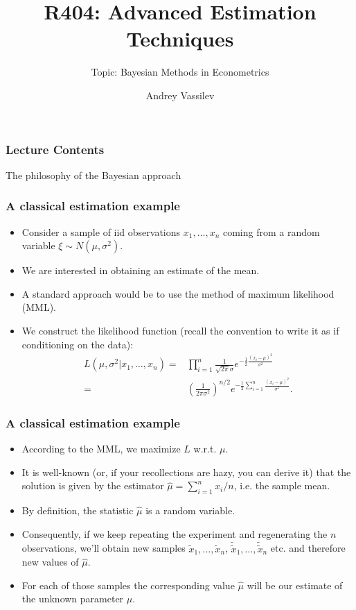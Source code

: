 \documentclass[10pt]{beamer}
\title{R404: Advanced Estimation Techniques}
\subtitle{Topic: Bayesian Methods in Econometrics}
\author{Andrey Vassilev}
\date{}
\theoremstyle{definition}
\begin{document}
\maketitle



\begin{frame}[fragile]
\frametitle{Lecture Contents}
\tableofcontents
\end{frame}

\begin{section}{The philosophy of the Bayesian approach}\label{sec:BayesPhil}

\begin{frame}
\frametitle{A classical estimation example}
\begin{itemize}\itemsep1em
\item Consider a sample of iid observations $x_1,\ldots,x_n$ coming from a random variable $\xi \sim N(\mu,\sigma^2)$.
\item We are interested in obtaining an estimate of the mean.
\item A standard approach would be to use the method of maximum likelihood (MML).
\item We construct the likelihood function (recall the convention to write it as if conditioning on the data):
\begin{equation}
\label{eq:NormLik}
\begin{split}
L(\mu,\sigma^2|x_1,\ldots,x_n)= & \prod_{i=1}^{n}\frac{1}{\sqrt{2\pi}\sigma}e^{-\frac{1}{2}\frac{(x_i-\mu)^2}{\sigma^2}}\\
= & \left(
\frac{1}{2\pi\sigma^2}
\right)^{n/2}e^{-\frac{1}{2}\sum_{i=1}^{n}\frac{(x_i-\mu)^2}{\sigma^2}}.
\end{split}
\end{equation}
\end{itemize}
\end{frame}

\begin{frame}
\frametitle{A classical estimation example}
\begin{itemize}\itemsep1em
\item According to the MML, we maximize $ L $ w.r.t. $ \mu $.
\item It is well-known (or, if your recollections are hazy, you can derive it) that the solution is given by the estimator $\hat{\mu}=\sum_{i=1}^{n}x_i/n$, i.e. the sample mean.
\item By definition, the statistic $\hat{\mu}$ is a random variable.
\item Consequently, if we keep repeating the experiment and regenerating the $ n $ observations, we'll obtain new samples $\tilde{x}_1,\ldots,\tilde{x}_n$,  $\tilde{\tilde{x}}_1,\ldots,\tilde{\tilde{x}}_n$ etc. and therefore new values of $\hat{\mu}$.
\item For each of those samples the corresponding value $\hat{\mu}$ will be our estimate of the unknown parameter $ \mu $.
\end{itemize}
\end{frame}


\end{section}
\end{document}
